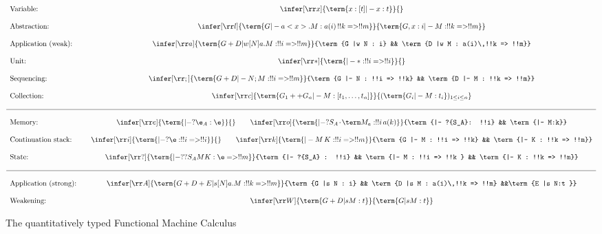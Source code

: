 \documentclass[a4paper,UKenglish,cleveref, autoref, thm-restate]{lipics-v2021}
\newcommand\vc[1]{\vcenter{\hbox{\ensuremath{#1}}}}
\newcommand\msep{\kern1pt{\cdot}\kern1pt}
\begin{document}
\begin{figure}
\[
\begin{array}{l@{\qquad}c}
		\text{Variable:}			&\vc{\infer[\rr x]{\term{x:[t] |- x:t}}{}}
\\ \\	\text{Abstraction:} 		&\vc{\infer[\rr l]{\term{G |- a<x>.M : a(i)\,!!k => !!m}}{\term{G, x:i |- M: !!k => !!m}}}
\\ \\	\text{Application (weak):} 	&\vc{\infer[\rr a]{\term{G+D |w [N]a.M : !!i => !!m}}{\term{G |w N : i} && \term{D |w M : a(i)\,!!k => !!m}}}
\\ \\	\text{Unit:}				&\vc{\infer[\rr *]{\term{|- * : !!i => !!i}}{}}
\\ \\	\text{Sequencing:}			&\vc{\infer[\rr ;]{\term{G+D |- N;M : !!i => !!m}}{\term{G |- N : !!i => !!k} && \term{D |- M : !!k => !!m}}}
\\ \\	\text{Collection:}			&\vc{\infer[\rr c]{\term{G_1 ++ G_n |- M : [t_1,\dots,t_n]}}{(\term{G_i |- M : t_i})_{1\leq i\leq n}}}
\\ \\   \hline
\\   	\text{Memory:}              &\vc{\infer[\rr e]{\term{|- ?{\e_A} : \e}}{} \qquad \infer[\rr o]{\term{|- ?{S_A\msep\term M_a} : !!i\,a(k)}}{\term{|- ?{S_A}: !!i} && \term{|- M:k}}}
\\ \\	\text{Continuation stack:}	&\vc{\infer[\rr i]{\term{|- ?{\e} : !!i => !!i}}{} \qquad \infer[\rr k]{\term{|- M\,K : !!i => !!m}}{\term{G |- M : !!i => !!k} && \term{|- K : !!k => !!m}}}
\\ \\	\text{State:}				&\vc{\infer[\rr ?]{\term{|- ??{S_A}MK : \e => !!m}}{\term{|- ?{S_A} : !!i} && \term{|- M : !!i => !!k } && \term{|- K : !!k => !!m}}}
\\ \\	\hline 
\\		\text{Application (strong):}&\vc{\infer[\rr A]{\term{G+D+E |s [N]a.M : !!k => !!m}}{\term{G |s N : i} && \term{D |s M : a(i)\,!!k => !!m} &&\term{E |s N:t }}}
\\ \\	\text{Weakening:}			&\vc{\infer[\rr W]{\term{G+D |s M : t}}{\term{G |s M : t}}}
\end{array}
\]
\caption{The quantitatively typed Functional Machine Calculus}
\label{fig:types}
\end{figure}
\end{document}
